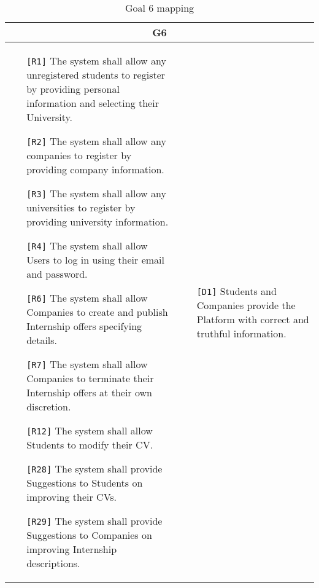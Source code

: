 \begin{table}[H]
    \centering
    \begin{tabular}{|p{8cm}|p{8cm}|}
         \hline
        \multicolumn{2}{|c|}{G6} \\
        \hline
        \begin{itemize}
            \item[\texttt{[R1]}] The system shall allow any unregistered students to register by providing personal information and selecting their University. 
            \item[\texttt{[R2]}] The system shall allow any companies to register by providing company information. 
            \item[\texttt{[R3]}] The system shall allow any universities to register by providing university information. 
            \item[\texttt{[R4]}] The system shall allow Users to log in using their email and password. 
            \item[\texttt{[R6]}] The system shall allow Companies to create and publish Internship offers specifying details.
            \item[\texttt{[R7]}] The system shall allow Companies to terminate their Internship offers at their own discretion.
            \item[\texttt{[R12]}] The system shall allow Students to modify their CV.
            \item[\texttt{[R28]}] The system shall provide Suggestions to Students on improving their CVs.
            \item[\texttt{[R29]}] The system shall provide Suggestions to Companies on improving Internship descriptions.
        \end{itemize} & 
        \begin{itemize}
            \item[\texttt{[D1]}] Students and Companies provide the Platform with correct and truthful information.
        \end{itemize} \\ \hline
    \end{tabular}
    \caption{Goal 6 mapping}
    \label{tab:G6}
\end{table}

